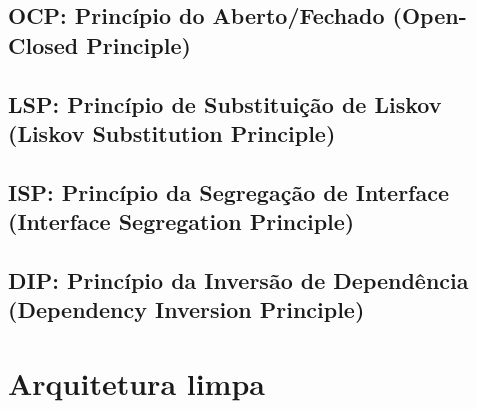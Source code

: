     \subsection{OCP: Princípio do Aberto/Fechado (Open-Closed Principle)}
    \subsection{LSP: Princípio de Substituição de Liskov (Liskov Substitution Principle)}
    \subsection{ISP: Princípio da Segregação de Interface (Interface Segregation Principle)}
    \subsection{DIP: Princípio da Inversão de Dependência (Dependency Inversion Principle)}

\section{Arquitetura limpa}
